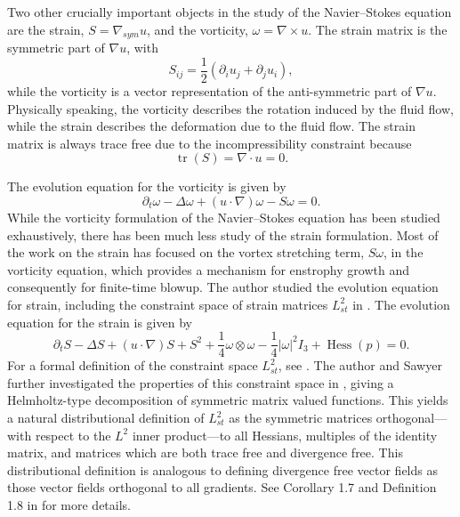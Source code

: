 \documentclass[11pt]{article}
\theoremstyle{plain}
\theoremstyle{remark}
\numberwithin{equation}{section}
\DeclareMathOperator*{\Hess}{Hess}
\DeclareMathOperator*{\tr}{tr}
\begin{document}
Two other crucially important objects in the study of the Navier--Stokes equation are the strain, $S=\nabla_{sym}u$,
and the vorticity, $\omega=\nabla \times u$.
The strain matrix is the symmetric part of $\nabla u$, with
\begin{equation}
    S_{ij}=\frac{1}{2}\left(
    \partial_i u_j +\partial_j u_i\right),
\end{equation}
while the vorticity is a vector representation of the anti-symmetric part of $\nabla u$.
Physically speaking, the vorticity describes the rotation induced by the fluid flow, while the strain describes the deformation due to the fluid flow.
The strain matrix is always trace free due to the incompressibility constraint because
\begin{equation}
    \tr(S)=\nabla\cdot u=0.
\end{equation}


The evolution equation for the vorticity is given by 
\begin{equation}
    \partial_t\omega-\Delta\omega
    +(u\cdot\nabla)\omega-S\omega=0.
\end{equation}
While the vorticity formulation of the Navier--Stokes equation has been studied exhaustively, there has been much less study of the strain formulation. Most of the work on the strain has focused on the vortex stretching term, $S\omega$, in the vorticity equation, which provides a mechanism for enstrophy growth and consequently for finite-time blowup.
The author studied the evolution equation for strain, including the constraint space of strain matrices $L^2_{st}$ 
 in \cite{MillerStrain}.
The evolution equation for the strain is given by
\begin{equation} \label{straineq}
    \partial_t S -\Delta S +(u\cdot \nabla)S
    +S^2+\frac{1}{4}\omega\otimes\omega
    -\frac{1}{4}|\omega|^2 I_3+\Hess(p)=0.
\end{equation}
For a formal definition of the constraint space $L^2_{st}$, see .
The author and Sawyer further investigated the properties of this constraint space in \cite{MillerSawyer}, giving a Helmholtz-type decomposition of symmetric matrix valued functions. This yields a natural distributional definition of $L^2_{st}$ as the symmetric matrices orthogonal---with respect to the $L^2$ inner product---to all Hessians, multiples of the identity matrix, and matrices which are both trace free and divergence free. This distributional definition is analogous to defining divergence free vector fields as those vector fields orthogonal to all gradients. See Corollary 1.7 and Definition 1.8 in \cite{MillerSawyer} for more details.
\end{document}

